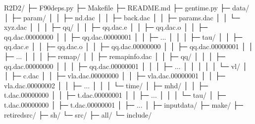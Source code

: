 \documentclass[letterpaper,10pt,dvipdfmx,report]{sphinxmanual}
\begin{document}
\begin{sphinxVerbatim}[commandchars=\\\{\}]
R2D2/
   ├─ F90\PYGZus{}deps.py
   ├─ Makefile
   ├─ README.md
   ├─ gen\PYGZus{}time.py
   ├─ data/
   │     ├─ param/
   │     │      ├─ nd.dac
   │     │      ├─ back.dac
   │     │      ├─ params.dac
   │     │      └─ xyz.dac
   │     │
   │     ├─ qq/
   │     │   ├─ qq.dac.e
   │     │   ├─ qq.dac.o
   │     │   ├─ qq.dac.00000000
   │     │   ├─ qq.dac.00000001
   │     │   ├─ ...
   │     │
   │     ├─ tau/
   │     │   ├─ qq.dac.e
   │     │   ├─ qq.dac.o
   │     │   ├─ qq.dac.00000000
   │     │   ├─ qq.dac.00000001
   │     │   ├─ ...
   │     │
   │     ├─ remap/
   │     │      ├─ remap\PYGZus{}info.dac
   │     │      ├─ qq/
   │     │      │   ├─ qq.dac.00000000
   │     │      │   ├─ qq.dac.00000001
   │     │      │   ├─ ...
   │     │      │
   │     │      └─ vl/
   │     │          ├─ c.dac
   │     │          ├─ vla.dac.00000000
   │     │          ├─ vla.dac.00000001
   │     │          ├─ vla.dac.00000002
   │     │          ├─ ...
   │     │
   │     └─ time/
   │           ├─ mhd/
   │           │    ├─ t.dac.00000000
   │           │    ├─ t.dac.00000001
   │           │    ├─ ...
   │           │
   │           └─ tau/
   │                ├─ t.dac.00000000
   │                ├─ t.dac.00000001
   │                ├─ ...
   │
   ├─ input\PYGZus{}data/
   ├─ make/
   ├─ retired\PYGZus{}src/
   ├─ sh/
   └─ src/
        ├─ all/
        └─ include/
\end{sphinxVerbatim}
\end{document}
